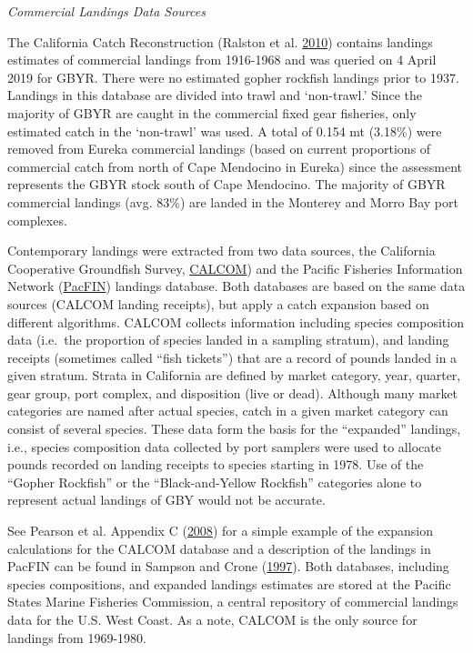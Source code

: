 \documentclass[12pt,]{article}
\begin{document}
\emph{Commercial Landings Data Sources}

The California Catch Reconstruction (Ralston et al.
\protect\hyperlink{ref-Ralston2010}{2010}) contains landings estimates
of commercial landings from 1916-1968 and was queried on 4 April 2019
for GBYR. There were no estimated gopher rockfish landings prior to
1937. Landings in this database are divided into trawl and `non-trawl.'
Since the majority of GBYR are caught in the commercial fixed gear
fisheries, only estimated catch in the `non-trawl' was used. A total of
0.154 mt (3.18\%) were removed from Eureka commercial landings (based on
current proportions of commercial catch from north of Cape Mendocino in
Eureka) since the assessment represents the GBYR stock south of Cape
Mendocino. The majority of GBYR commercial landings (avg. 83\%) are
landed in the Monterey and Morro Bay port complexes.

Contemporary landings were extracted from two data sources, the
California Cooperative Groundfish Survey,
\href{https://calcom.psmfc.org/}{CALCOM}) and the Pacific Fisheries
Information Network (\href{https://pacfin.psmfc.org/}{PacFIN}) landings
database. Both databases are based on the same data sources (CALCOM
landing receipts), but apply a catch expansion based on different
algorithms. CALCOM collects information including species composition
data (i.e.~the proportion of species landed in a sampling stratum), and
landing receipts (sometimes called ``fish tickets'') that are a record
of pounds landed in a given stratum. Strata in California are defined by
market category, year, quarter, gear group, port complex, and
disposition (live or dead). Although many market categories are named
after actual species, catch in a given market category can consist of
several species. These data form the basis for the ``expanded''
landings, i.e., species composition data collected by port samplers were
used to allocate pounds recorded on landing receipts to species starting
in 1978. Use of the ``Gopher Rockfish'' or the ``Black-and-Yellow
Rockfish'' categories alone to represent actual landings of GBY would
not be accurate.

See Pearson et al. Appendix C
(\protect\hyperlink{ref-Pearson2008}{2008}) for a simple example of the
expansion calculations for the CALCOM database and a description of the
landings in PacFIN can be found in Sampson and Crone
(\protect\hyperlink{ref-Sampson1997}{1997}). Both databases, including
species compositions, and expanded landings estimates are stored at the
Pacific States Marine Fisheries Commission, a central repository of
commercial landings data for the U.S. West Coast. As a note, CALCOM is
the only source for landings from 1969-1980.
\end{document}
